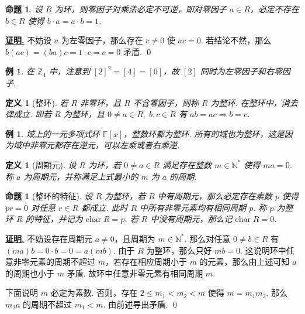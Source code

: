 \documentclass[10pt,openany]{article}
\theoremstyle{thmstyle} %
\theoremstyle{defstyle} %
\newtheorem{definition}[theorem]{定义}
\theoremstyle{prostyle} %
\newtheorem{proposition}[theorem]{命题}
\theoremstyle{exastyle}
\newtheorem{example}[theorem]{例}
\theoremstyle{remstyle}
\renewenvironment{proof}[1][证明]{\par\underline{\textbf{#1.}} \;\fangsong}{\qed\par}
\newcommand{\F}{\mathbb{F}}
\newcommand{\tz}{\mathrm{char} \;}
\begin{document}
\begin{proposition}
	设 \( R \) 为环，则零因子对乘法必定不可逆，即对零因子 \( a \in R \)，必定不存在 \( b \in R \) 使得 \( b \cdot a=a \cdot b=1 \).
\end{proposition}

\begin{proof}
	不妨设 \( a \) 为左零因子，那么存在 \( c \neq 0 \) 使 \( ac=0 \). 若结论不然，那么 \( b(ac)=(ba)c=1 \cdot c=c=0 \) 矛盾.
\end{proof}

\begin{example}
	在 \( \mathbb{Z}_4 \) 中，注意到 \( [2]^2=[4]=[0] \)，故 \( [2] \) 同时为左零因子和右零因子. 
\end{example}

\begin{definition}[整环]
	若 \( R \) 非零环，且 \( R \) 不含零因子，则称 \( R \) 为整环. 在整环中，消去律成立. 即若 \( R \) 为整环，且 \( 0 \neq a \in R, \; b,c \in R \) 有 \(ab=ac \Rightarrow b=c \).
\end{definition}

\begin{example}
	域上的一元多项式环 \( \F[x] \)，整数环都为整环. 所有的域也为整环，这是因为域中非零元都存在逆元，可以左乘或者右乘逆.
\end{example}

\begin{definition}[周期元]
	设 \( R \) 为环，若 \( 0 \neq a \in R \) 满足存在整数 \( m \in \mathbb{N}^* \) 使得 \( ma=0 \). 称 \( a \) 为周期元，并称满足上式最小的 \( m \) 为 \( a \) 的周期. 
\end{definition}

\begin{proposition}[整环的特征]	\label{1.2.24}
	设 \( R \) 为整环，若 \( R \) 中有周期元，那么必定存在素数 \( p \) 使得 \( pr=0 \) 对任意 \( r \in R \) 都成立. 此时 \( R \) 中所有非零元素均有相同周期 \( p \). 称 \( p \) 为整环 \( R \) 的特征，并记为 \( \tz  R=p \). 若 \( R \) 中没有周期元，那么记 \( \tz  R=0 \).

\end{proposition}

\begin{proof}
	不妨设存在周期元 \( a \neq 0 \)，且周期为 \( m \in \mathbb{N}^* \). 那么对任意 \( 0 \neq b \in R \) 有 \( (ma)b=0 \cdot b=0=a(mb) \). 由于 \( R \) 为整环，那么只好 \( mb=0 \). 这说明环中任意非零元素的周期不超过 \( m \)，若存在相应周期小于 \( m \) 的元素，那么由上述可知 \( a \) 的周期也小于 \( m \) 矛盾. 故环中任意非零元素有相同周期 \( m \).
	
	下面说明 \( m \) 必定为素数. 否则，存在 \( 2 \leq m_1<m_2<m \) 使得 \( m=m_1m_2 \). 那么 \( m_2a \) 的周期不超过 \( m_1<m \). 由前述导出矛盾. 
\end{proof}
\end{document}
